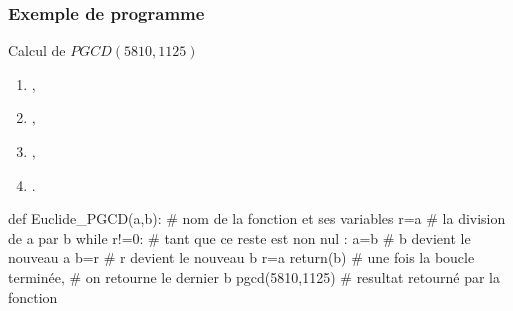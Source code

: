 \begin{frame}[fragile]
\frametitle{Exemple de programme}

\begin{minipage}{0.45\linewidth}
Calcul de $PGCD(5810,1125)$
\end{minipage}\hfill
\begin{minipage}{0.45\linewidth}
\begin{enumerate}
 \item {},
 \item {},
 \item {},
 \item {}.
\end{enumerate}
\end{minipage}

\begin{GrayBox}[0.9\textwidth]
\begin{verbatimtab}[3]
def Euclide_PGCD(a,b): # nom de la fonction et ses variables
	r=a%
						# la division de a par b
	while r!=0: 	# tant que ce reste est non nul :
			a=b 		# b devient le nouveau a
			b=r 		# r devient le nouveau b
			r=a%
	return(b) 		# une fois la boucle terminée,
						# on retourne le dernier b
pgcd(5810,1125)  # resultat retourné par la fonction
\end{verbatimtab}
\end{GrayBox}

\vspace{-0.5cm}

\end{frame}


